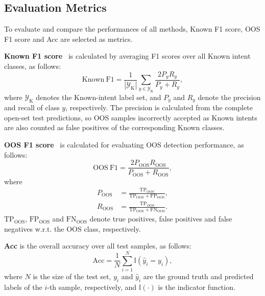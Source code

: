 \documentclass[11pt]{article}
\begin{document}
\subsection{Evaluation Metrics}

To evaluate and compare the performances of all methods, Known F1 score, OOS F1 score and Acc are selected as metrics.

\textbf{Known F1 score}~\citep{wang2021texsmart,zawbaa2024improved} is calculated by averaging F1 scores over all Known intent classes, as follows:
\begin{equation}
\mathrm{Known\ F1}=\frac{1}{|\mathcal{Y}_{\mathrm{K}}|}\sum_{y\in\mathcal{Y}_{\mathrm{K}}}\frac{2P_yR_y}{P_y+R_y},
\end{equation}
where $\mathcal{Y}_{\mathrm{K}}$ denotes the Known-intent label set, and $P_y$ and $R_y$ denote the precision and recall of class $y$, respectively. The precision is calculated from the complete open-set test predictions, so OOS samples incorrectly accepted as Known intents are also counted as false positives of the corresponding Known classes.

\textbf{OOS F1 score}~\citep{wang2021texsmart,zawbaa2024improved} is calculated for evaluating OOS detection performance, as follows:
\begin{equation}
\mathrm{OOS\ F1}=\frac{2P_{\mathrm{OOS}}R_{\mathrm{OOS}}}{P_{\mathrm{OOS}}+R_{\mathrm{OOS}}},
\end{equation}
where
\begin{equation}
\begin{aligned}
P_{\mathrm{OOS}}&=\frac{\mathrm{TP}_{\mathrm{OOS}}}{\mathrm{TP}_{\mathrm{OOS}}+\mathrm{FP}_{\mathrm{OOS}}},\\
R_{\mathrm{OOS}}&=\frac{\mathrm{TP}_{\mathrm{OOS}}}{\mathrm{TP}_{\mathrm{OOS}}+\mathrm{FN}_{\mathrm{OOS}}}.
\end{aligned}
\end{equation}
$\mathrm{TP}_{\mathrm{OOS}}$, $\mathrm{FP}_{\mathrm{OOS}}$ and $\mathrm{FN}_{\mathrm{OOS}}$ denote true positives, false positives and false negatives w.r.t. the OOS class, respectively.

\textbf{Acc} is the overall accuracy over all test samples, as follows:
\begin{equation}
\mathrm{Acc}=\frac{1}{N}\sum_{i=1}^{N}\mathbb{I}(\hat{y}_i=y_i),
\end{equation}
where $N$ is the size of the test set, $y_i$ and $\hat{y}_i$ are the ground truth and predicted labels of the $i$-th sample, respectively, and $\mathbb{I}(\cdot)$ is the indicator function.
\end{document}
